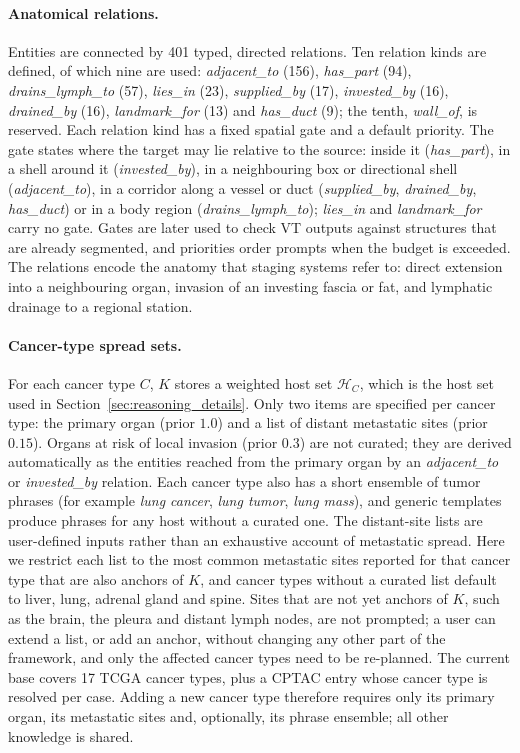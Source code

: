 \documentclass[fleqn,10pt]{olplainarticle}
\begin{document}
\paragraph{Anatomical relations.}
Entities are connected by 401 typed, directed relations. Ten relation kinds are defined, of which nine are used:
\emph{adjacent\_to} (156), \emph{has\_part} (94), \emph{drains\_lymph\_to} (57), \emph{lies\_in} (23),
\emph{supplied\_by} (17), \emph{invested\_by} (16), \emph{drained\_by} (16), \emph{landmark\_for} (13) and
\emph{has\_duct} (9); the tenth, \emph{wall\_of}, is reserved. Each relation kind has a fixed spatial gate and a default
priority. The gate states where the target may lie relative to the source: inside it (\emph{has\_part}), in a shell
around it (\emph{invested\_by}), in a neighbouring box or directional shell (\emph{adjacent\_to}), in a corridor along
a vessel or duct (\emph{supplied\_by}, \emph{drained\_by}, \emph{has\_duct}) or in a body region
(\emph{drains\_lymph\_to}); \emph{lies\_in} and \emph{landmark\_for} carry no gate. Gates are later used to check VT
outputs against structures that are already segmented, and priorities order prompts when the budget is exceeded. The relations encode the anatomy that staging systems refer to: direct extension
into a neighbouring organ, invasion of an investing fascia or fat, and lymphatic drainage to a regional station.

\paragraph{Cancer-type spread sets.}
For each cancer type $C$, $K$ stores a weighted host set $\mathcal{H}_C$, which is the host set used in
Section~\ref{sec:reasoning_details}. Only two items are specified per cancer type: the primary organ (prior $1.0$) and a list of
distant metastatic sites (prior $0.15$). Organs at risk of local invasion (prior $0.3$) are not curated; they are
derived automatically as the entities reached from the primary organ by an \emph{adjacent\_to} or \emph{invested\_by}
relation. Each cancer type also has a short ensemble of tumor phrases (for example \emph{lung cancer}, \emph{lung
tumor}, \emph{lung mass}), and generic templates produce phrases for any host without a curated one. The distant-site lists are user-defined inputs rather than an exhaustive account of metastatic spread. Here we
restrict each list to the most common metastatic sites reported for that cancer type that are also anchors of $K$, and
cancer types without a curated list default to liver, lung, adrenal gland and spine. Sites that are not yet anchors of
$K$, such as the brain, the pleura and distant lymph nodes, are not prompted; a user can extend a list, or add an anchor,
without changing any other part of the framework, and only the affected cancer types need to be re-planned. The current
base covers 17 TCGA cancer types, plus a CPTAC entry whose cancer type is resolved per case. Adding a new cancer type
therefore requires only its primary organ, its metastatic sites and, optionally, its phrase ensemble; all other
knowledge is shared.
\end{document}
